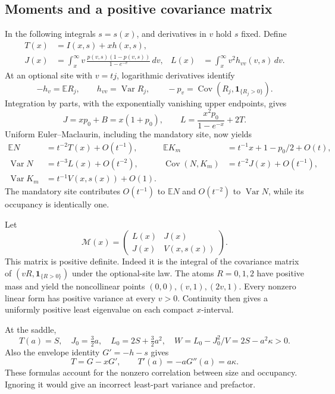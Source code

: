 \documentclass[11pt,letterpaper]{article}
\numberwithin{equation}{section}
\theoremstyle{definition}\newtheorem{definition}[theorem]{Definition}
\theoremstyle{remark}\newtheorem{remark}[theorem]{Remark}
\DeclareMathOperator{\Var}{Var}
\DeclareMathOperator{\Cov}{Cov}
\newcommand{\E}{\mathbb E}
\begin{document}
\subsection{Moments and a positive covariance matrix}
In the following integrals $s=s(x)$, and derivatives in $v$ hold $s$ fixed. Define
\begin{align}\label{mss:eq:TJL}
T(x)&=I(x,s)+xh(x,s),\\
J(x)&=\int_x^\infty v\,\frac{p(v,s)(1-p(v,s))}{1-e^{-v}}\,dv,
&L(x)&=\int_x^\infty v^2h_{vv}(v,s)\,dv.\nonumber
\end{align}
At an optional site with $v=tj$, logarithmic derivatives identify
\begin{equation}\label{mss:eq:sitecov}
-h_v=\E R_j,\qquad h_{vv}=\Var R_j,\qquad
-p_v=\Cov(R_j,\mathbf1_{\{R_j>0\}}).
\end{equation}
Integration by parts, with the exponentially vanishing upper endpoints, gives
\begin{equation}\label{mss:eq:JL}
J=xp_0+B=x(1+p_0),\qquad
L=\frac{x^2p_0}{1-e^{-x}}+2T.
\end{equation}
Uniform Euler--Maclaurin, including the mandatory site, now yields
\begin{align}\label{mss:eq:means}
\E N&=t^{-2}T(x)+O(t^{-1}),&
\E K_m&=t^{-1}x+1-p_0/2+O(t),\\
\Var N&=t^{-3}L(x)+O(t^{-2}),&
\Cov(N,K_m)&=t^{-2}J(x)+O(t^{-1}),\nonumber\\
\Var K_m&=t^{-1}V(x,s(x))+O(1).&&\nonumber
\end{align}
The mandatory site contributes $O(t^{-1})$ to $\E N$ and $O(t^{-2})$ to $\Var N$, while its occupancy is identically one.

Let
\begin{equation}\label{mss:eq:covmatrix}
\mathcal M(x)=\begin{pmatrix}L(x)&J(x)\\J(x)&V(x,s(x))\end{pmatrix}.
\end{equation}
This matrix is positive definite. Indeed it is the integral of the covariance matrix of $(vR,\mathbf1_{\{R>0\}})$ under the optional-site law. The atoms $R=0,1,2$ have positive mass and yield the noncollinear points $(0,0),(v,1),(2v,1)$. Every nonzero linear form has positive variance at every $v>0$. Continuity then gives a uniformly positive least eigenvalue on each compact $x$-interval.

At the saddle,
\begin{equation}\label{mss:eq:saddlecov}
T(a)=S,\quad J_0=\tfrac32a,\quad L_0=2S+\tfrac32a^2,
\quad W=L_0-J_0^2/V=2S-a^2\kappa>0.
\end{equation}
Also the envelope identity $G'=-h-s$ gives
\begin{equation}\label{mss:eq:Tidentity}
T=G-xG',\qquad T'(a)=-aG''(a)=a\kappa.
\end{equation}
These formulas account for the nonzero correlation between size and occupancy. Ignoring it would give an incorrect least-part variance and prefactor.
\end{document}

